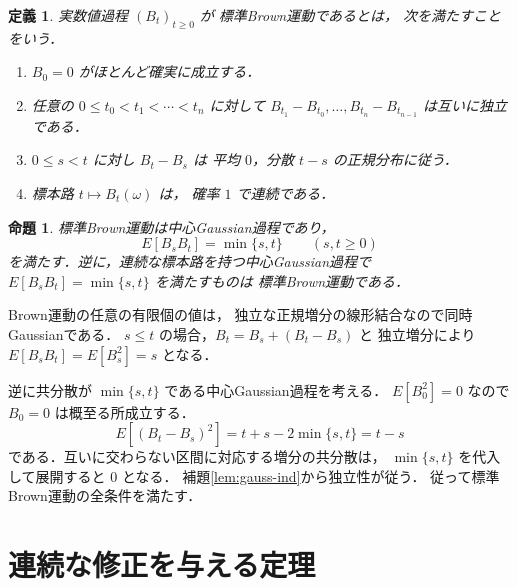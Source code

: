 \documentclass[a5paper,10pt,onecolumn]{jsarticle}
\makeatletter
\theoremstyle{mathnotetheorem}
\newtheorem{definition}[theorem]{定義}
\newtheorem{proposition}[theorem]{命題}
\renewcommand{\proofname}{証明}
\renewenvironment{proof}[1][\proofname]{%
  \par\pushQED{\qed}\normalfont\topsep4\p@\@plus2\p@\relax
  \trivlist\item[\hskip\labelsep\bfseries #1]\ignorespaces
}{\popQED\endtrivlist\@endpefalse}
\makeatother
\begin{document}
\begin{definition}
実数値過程 $(B_t)_{t\ge0}$ が
\emph{標準Brown運動}であるとは，
次を満たすことをいう．
\begin{enumerate}
\item $B_0=0$ がほとんど確実に成立する．
\item 任意の $0\le t_0<t_1<\cdots<t_n$ に対して
$B_{t_1}-B_{t_0},\dots,B_{t_n}-B_{t_{n-1}}$
は互いに独立である．
\item $0\le s<t$ に対し $B_t-B_s$ は
平均 $0$，分散 $t-s$ の正規分布に従う．
\item 標本路 $t\mapsto B_t(\omega)$ は，
確率 $1$ で連続である．
\end{enumerate}
\end{definition}

\begin{proposition}\label{prop:covariance}
標準Brown運動は中心Gaussian過程であり，
\[
 E[B_sB_t]=\min\{s,t\}
 \qquad(s,t\ge0)
\]
を満たす．逆に，連続な標本路を持つ中心Gaussian過程で
$E[B_sB_t]=\min\{s,t\}$ を満たすものは
標準Brown運動である．
\end{proposition}
\begin{proof}
Brown運動の任意の有限個の値は，
独立な正規増分の線形結合なので同時Gaussianである．
$s\le t$ の場合，$B_t=B_s+(B_t-B_s)$ と
独立増分により
$E[B_sB_t]=E[B_s^2]=s$ となる．

逆に共分散が $\min\{s,t\}$ である中心Gaussian過程を考える．
$E[B_0^2]=0$ なので $B_0=0$ は概至る所成立する．
\[
 E[(B_t-B_s)^2]=t+s-2\min\{s,t\}=t-s
\]
である．互いに交わらない区間に対応する増分の共分散は，
$\min\{s,t\}$ を代入して展開すると $0$ となる．
補題\ref{lem:gauss-ind}から独立性が従う．
従って標準Brown運動の全条件を満たす．
\end{proof}

\section{連続な修正を与える定理}
\end{document}
